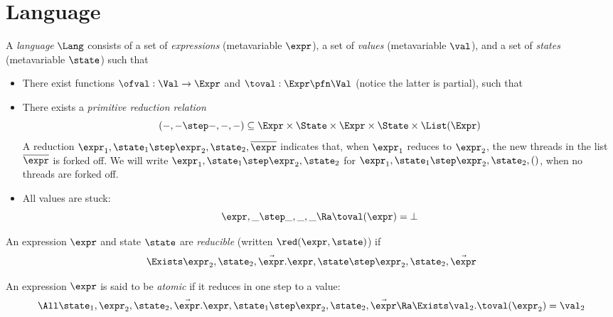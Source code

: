 \section{Language}
\label{sec:language}

A \emph{language} $\Lang$ consists of a set \Expr{} of \emph{expressions} (metavariable $\expr$), a set \Val{} of \emph{values} (metavariable $\val$), and a set \State of \emph{states} (metavariable $\state$) such that
\begin{itemize}
\item There exist functions $\ofval : \Val \to \Expr$ and $\toval : \Expr \pfn \Val$ (notice the latter is partial), such that
\item There exists a \emph{primitive reduction relation} \[(-,- \step -,-,-) \subseteq \Expr \times \State \times \Expr \times \State \times \List(\Expr)\]
  A reduction $\expr_1, \state_1 \step \expr_2, \state_2, \overline\expr$ indicates that, when $\expr_1$ reduces to $\expr_2$, the new threads in the list $\overline\expr$ is forked off.
  We will write $\expr_1, \state_1 \step \expr_2, \state_2$ for $\expr_1, \state_1 \step \expr_2, \state_2, ()$, \ie when no threads are forked off. \\
\item All values are stuck:
\[ \expr, \_ \step  \_, \_, \_ \Ra \toval(\expr) = \bot \]
\end{itemize}

\begin{defn}
  An expression $\expr$ and state $\state$ are \emph{reducible} (written $\red(\expr, \state)$) if
  \[ \Exists \expr_2, \state_2, \vec\expr. \expr,\state \step \expr_2,\state_2,\vec\expr \]
\end{defn}

\begin{defn}
  An expression $\expr$ is said to be \emph{atomic} if it reduces in one step to a value:
  \[ \All\state_1, \expr_2, \state_2, \vec\expr. \expr, \state_1 \step \expr_2, \state_2, \vec\expr \Ra \Exists \val_2. \toval(\expr_2) = \val_2 \]
\end{defn}

